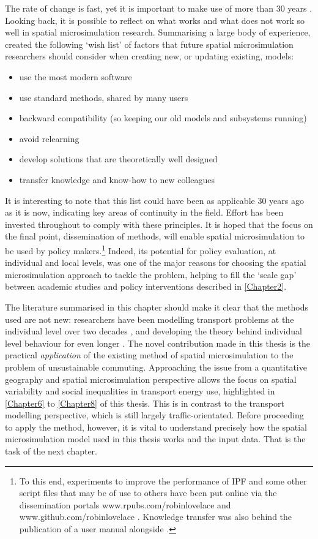 The rate of change is fast, yet it is important to make use of more than 30 years
. Looking back, it is possible to reflect
on what works and what does not work so well in spatial microsimulation
research. Summarising a large body of experience,
\citet[p.~197]{Holm2013-design-principles} created the following `wish list' of
factors that future spatial microsimulation researchers should consider
when creating new, or updating existing, models:
\begin{itemize}
\item  use the most modern software
\item  use standard methods, shared by many users
\item  backward compatibility (so keeping our old models and subsystems running)
\item  avoid relearning
\item  develop solutions that are theoretically well designed
\item  transfer knowledge and know-how to new colleagues
\end{itemize}
It is interesting to note that this list could have been as applicable 30 years
ago as it is now, indicating key areas of continuity in the field.
Effort has been invested throughout to comply with these
principles. It is hoped that the focus on the final point, dissemination of methods,
will enable spatial microsimulation to be used by policy
makers.\footnote{To
this end, experiments to improve the performance of IPF and some other
script files that may be of use to others
have been put online via the dissemination portals www.rpubs.com/robinlovelace
and www.github.com/robinlovelace . Knowledge transfer was also behind the
publication of a user manual alongside \citet{Lovelace2013-trs}.
}
Indeed,
its potential for policy evaluation, at individual and local levels, was
one of the major reasons for choosing the spatial microsimulation approach
to tackle the problem, helping to fill the `scale gap' between academic
studies and policy interventions described in \cref{Chapter2}.

The literature summarised in this chapter should make it clear that
the methods used are not new: researchers have been modelling
transport problems at the individual level over two decades \citep{Ortuzar1982},
and developing the theory behind individual level behaviour for even longer
\citep{Wilson1970}.
The novel
contribution made in this thesis is the practical \emph{application} of
the existing method of spatial microsimulation to the problem of unsustainable
commuting. Approaching the issue from a quantitative geography and spatial
microsimulation perspective allows the focus on spatial
variability and social inequalities in transport energy use, highlighted in
\cref{Chapter6} to \cref{Chapter8} of this thesis. This is in contrast to the 
transport modelling perspective, which is still largely traffic-orientated.
Before proceeding to apply
the method, however, it is vital to understand precisely how the
spatial microsimulation model used in this thesis works and the input data.
That is the task of the next chapter.



